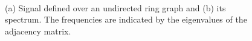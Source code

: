 \begin{figure}
	\centering
	\begin{minipage}[c]{0.25\linewidth}
	\end{minipage}~
	\begin{minipage}[c]{0.25\linewidth}
	\end{minipage}%
	\caption{(a) Signal defined over an undirected ring graph and (b) its spectrum. The frequencies are indicated by the eigenvalues of the adjacency matrix.}%
	\label{fig:diff_struct_GSPA}%
	\vspace{-0.2cm}
\end{figure}

